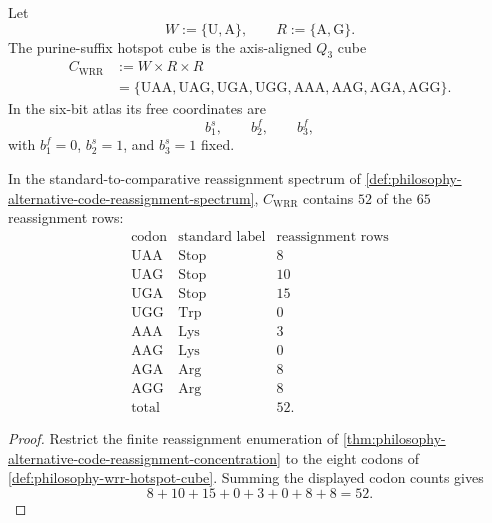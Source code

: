 \begin{definition}
\label{def:philosophy-wrr-hotspot-cube}
Let
$$
  W:=\{\mathrm{U},\mathrm{A}\},
  \qquad
  R:=\{\mathrm{A},\mathrm{G}\}.
$$
The purine-suffix hotspot cube is the axis-aligned $Q_{3}$ cube
$$
\begin{aligned}
  C_{\mathrm{WRR}}
    &:=
      W\times R\times R\\
    &=
      \{\mathrm{UAA},\mathrm{UAG},\mathrm{UGA},\mathrm{UGG},
        \mathrm{AAA},\mathrm{AAG},\mathrm{AGA},\mathrm{AGG}\}.
\end{aligned}
$$
In the six-bit atlas its free coordinates are
$$
  b_{1}^{s},\qquad b_{2}^{f},\qquad b_{3}^{f},
$$
with $b_{1}^{f}=0$, $b_{2}^{s}=1$, and $b_{3}^{s}=1$ fixed.
\end{definition}

\begin{theorem}
\label{thm:philosophy-wrr-hotspot-count}
In the standard-to-comparative reassignment spectrum of
\autoref{def:philosophy-alternative-code-reassignment-spectrum},
$C_{\mathrm{WRR}}$ contains $52$ of the $65$ reassignment rows:
$$
\begin{array}{c|c|r}
  \text{codon} & \text{standard label} & \text{reassignment rows}\\
\hline
  \mathrm{UAA} & \mathrm{Stop} & 8\\
  \mathrm{UAG} & \mathrm{Stop} & 10\\
  \mathrm{UGA} & \mathrm{Stop} & 15\\
  \mathrm{UGG} & \mathrm{Trp} & 0\\
  \mathrm{AAA} & \mathrm{Lys} & 3\\
  \mathrm{AAG} & \mathrm{Lys} & 0\\
  \mathrm{AGA} & \mathrm{Arg} & 8\\
  \mathrm{AGG} & \mathrm{Arg} & 8\\
\hline
  \text{total} & & 52.
\end{array}
$$
\end{theorem}
\begin{proof}
Restrict the finite reassignment enumeration of
\autoref{thm:philosophy-alternative-code-reassignment-concentration} to
the eight codons of \autoref{def:philosophy-wrr-hotspot-cube}. Summing
the displayed codon counts gives
$$
  8+10+15+0+3+0+8+8=52.
$$
\end{proof}


